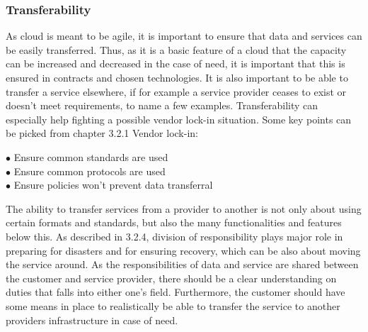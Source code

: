 \documentclass{article}
\begin{document}
\subsubsection{Transferability}
As cloud is meant to be agile, it is important to ensure that data and services can be easily transferred. Thus, as it is a basic feature of a cloud that the capacity can be increased and decreased in the case of need, it is important that this is ensured in contracts and chosen technologies. It is also important to be able to transfer a service elsewhere, if for example a service provider ceases to exist or doesn't meet requirements, to name a few examples. Transferability can especially help fighting a possible vendor lock-in situation. Some key points can be picked from chapter 3.2.1 Vendor lock-in:
\begin{description}
	\item[$\bullet$ Ensure common standards are used]
	\item[$\bullet$ Ensure common protocols are used]
	\item[$\bullet$ Ensure policies won't prevent data transferral]
\end{description}

\par
The ability to transfer services from a provider to another is not only about using certain formats and standards, but also the many functionalities and features below this. As described in 3.2.4, division of responsibility plays major role in preparing for disasters and for ensuring recovery, which can be also about moving the service around. As the responsibilities of data and service are shared between the customer and service provider, there should be a clear understanding on duties that falls into either one's field. Furthermore, the customer should have some means in place to realistically be able to transfer the service to another providers infrastructure in case of need.
\end{document}
